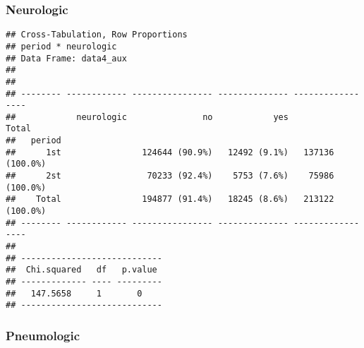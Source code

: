 \documentclass[
]{article}
\newenvironment{Shaded}{\begin{snugshade}}{\end{snugshade}}
\newcommand{\DataTypeTok}[1]{\textcolor[rgb]{0.13,0.29,0.53}{#1}}
\newcommand{\KeywordTok}[1]{\textcolor[rgb]{0.13,0.29,0.53}{\textbf{#1}}}
\newcommand{\NormalTok}[1]{#1}
\newcommand{\OperatorTok}[1]{\textcolor[rgb]{0.81,0.36,0.00}{\textbf{#1}}}
\newcommand{\OtherTok}[1]{\textcolor[rgb]{0.56,0.35,0.01}{#1}}
\newcommand{\StringTok}[1]{\textcolor[rgb]{0.31,0.60,0.02}{#1}}
\begin{document}
\hypertarget{neurologic-1}{%
\subsubsection{Neurologic}\label{neurologic-1}}

\begin{Shaded}
\end{Shaded}

\begin{verbatim}
## Cross-Tabulation, Row Proportions  
## period * neurologic  
## Data Frame: data4_aux  
## 
## 
## -------- ------------ ---------------- -------------- -----------------
##            neurologic               no            yes             Total
##   period                                                               
##      1st                124644 (90.9%)   12492 (9.1%)   137136 (100.0%)
##      2st                 70233 (92.4%)    5753 (7.6%)    75986 (100.0%)
##    Total                194877 (91.4%)   18245 (8.6%)   213122 (100.0%)
## -------- ------------ ---------------- -------------- -----------------
## 
## ----------------------------
##  Chi.squared   df   p.value 
## ------------- ---- ---------
##   147.5658     1       0    
## ----------------------------
\end{verbatim}

\hypertarget{pneumologic-1}{%
\subsubsection{Pneumologic}\label{pneumologic-1}}

\begin{Shaded}
\end{Shaded}
\end{document}

